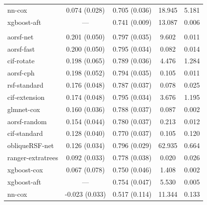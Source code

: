 \documentclass{article}\usepackage[]{graphicx}\usepackage[]{xcolor}
\newenvironment{knitrout}{}{} %
\begin{document}
\begin{knitrout}
\begin{longtable}[t]{lcccc}
\hspace{1em}nn-cox & 0.074 (0.028) & 0.705 (0.036) & 18.945 & 5.181\\
\hspace{1em}xgboost-aft & --- & 0.741 (0.009) & 13.087 & 0.006\\
\addlinespace[0.3em]
\multicolumn{5}{l}{\textit{\textbf{VA lung cancer trial; death, n = 137, p = 8}}}\\
\hline
\hspace{1em}aorsf-net & 0.201 (0.050) & 0.797 (0.035) & 9.602 & 0.011\\
\hspace{1em}aorsf-fast & 0.200 (0.050) & 0.795 (0.034) & 0.082 & 0.014\\
\hspace{1em}cif-rotate & 0.198 (0.065) & 0.789 (0.036) & 4.476 & 1.284\\
\hspace{1em}aorsf-cph & 0.198 (0.052) & 0.794 (0.035) & 0.105 & 0.011\\
\hspace{1em}rsf-standard & 0.176 (0.048) & 0.787 (0.037) & 0.078 & 0.025\\
\hspace{1em}cif-extension & 0.174 (0.048) & 0.795 (0.034) & 3.676 & 1.195\\
\hspace{1em}glmnet-cox & 0.160 (0.036) & 0.788 (0.037) & 0.087 & 0.002\\
\hspace{1em}aorsf-random & 0.154 (0.044) & 0.780 (0.037) & 0.213 & 0.012\\
\hspace{1em}cif-standard & 0.128 (0.040) & 0.770 (0.037) & 0.105 & 0.120\\
\hspace{1em}obliqueRSF-net & 0.126 (0.034) & 0.796 (0.029) & 62.935 & 0.664\\
\hspace{1em}ranger-extratrees & 0.092 (0.033) & 0.778 (0.038) & 0.020 & 0.026\\
\hspace{1em}xgboost-cox & 0.067 (0.078) & 0.750 (0.046) & 1.408 & 0.002\\
\hspace{1em}xgboost-aft & --- & 0.754 (0.047) & 5.530 & 0.005\\
\hspace{1em}nn-cox & -0.023 (0.033) & 0.517 (0.114) & 11.344 & 0.133\\*
\end{longtable}

\end{knitrout}
\end{document}
